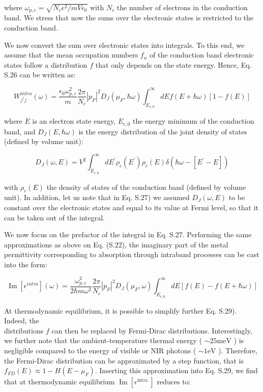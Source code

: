 \documentclass[10pt]{article}
\begin{document}
where $\omega_{p, c}=\sqrt{N_{c} e^{2} / m V \epsilon_{0}}$ with $N_{c}$ the number of electrons in the conduction band. We stress that now the sums over the electronic states is restricted to the conduction band.

We now convert the sum over electronic states into integrals. To this end, we assume that the mean occupation numbers $f_{n}$ of the conduction band electronic states follow a distribution $f$ that only depends on the state energy. Hence, Eq. S.26 can be written as:


\begin{equation*}
W_{j^{\dagger} j}^{i n t r a}(\omega)=\frac{\epsilon_{0} \omega_{p, c}^{2}}{m} \frac{2 \pi}{N_{c}}\left|p_{F}\right|^{2} D_{J}\left(\mu_{F}, \hbar \omega\right) \int_{E_{c, 0}}^{\infty} d E f(E+\hbar \omega)[1-f(E)] \tag{S.27}
\end{equation*}


where $E$ is an electron state energy, $E_{c, 0}$ the energy minimum of the conduction band, and $D_{J}(E, \hbar \omega)$ is the energy distribution of the joint density of states (defined by volume unit):


\begin{equation*}
D_{J}(\omega, E)=V^{2} \int_{E_{c, 0}}^{\infty} d E^{\prime} \rho_{c}\left(E^{\prime}\right) \rho_{c}(E) \delta\left(\hbar \omega-\left[E^{\prime}-E\right]\right) \tag{S.28}
\end{equation*}


with $\rho_{c}(E)$ the density of states of the conduction band (defined by volume unit). In addition, let us note that in Eq. S.27) we assumed $D_{J}(\omega, E)$ to be constant over the electronic states and equal to its value at Fermi level, so that it can be taken out of the integral.

We now focus on the prefactor of the integral in Eq. S.27. Performing the same approximations as above on Eq. (S.22), the imaginary part of the metal permittivity corresponding to absorption through intraband processes can be cast into the form:


\begin{equation*}
\operatorname{Im}\left[\epsilon^{i n t r a}\right](\omega)=\frac{\omega_{p, c}^{2}}{2 \hbar m \omega^{2}} \frac{2 \pi}{N_{c}}\left|p_{F}\right|^{2} D_{J}\left(\mu_{F}, \omega\right) \int_{E_{c, 0}}^{\infty} d E[f(E)-f(E+\hbar \omega)] \tag{S.29}
\end{equation*}


At thermodynamic equilibrium, it is possible to simplify further Eq. S.29). Indeed, the\\
distributions $f$ can then be replaced by Fermi-Dirac distributions. Interestingly, we further note that the ambient-temperature thermal energy ( $\sim 25 \mathrm{meV}$ ) is negligible compared to the energy of visible or NIR photons ( $\sim 1 \mathrm{eV}$ ). Therefore, the Fermi-Dirac distribution can be approximated by a step function, that is $f_{F D}(E) \approx 1-H\left(E-\mu_{F}\right)$. Inserting this approximation into Eq. S.29, we find that at thermodynamic equilibrium $\operatorname{Im}\left[\epsilon^{\text {intra }}\right]$ reduces to:
\end{document}
